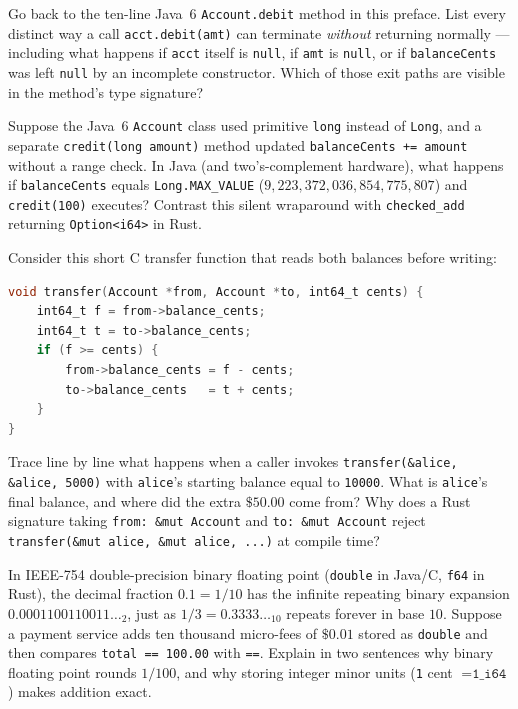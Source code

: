 \begin{exercise}
Go back to the ten-line Java~6 \texttt{Account.debit} method in this preface. List every distinct way a call \texttt{acct.debit(amt)} can terminate \emph{without} returning normally --- including what happens if \texttt{acct} itself is \texttt{null}, if \texttt{amt} is \texttt{null}, or if \texttt{balanceCents} was left \texttt{null} by an incomplete constructor. Which of those exit paths are visible in the method's type signature?
\end{exercise}

\begin{exercise}
Suppose the Java~6 \texttt{Account} class used primitive \texttt{long} instead of \texttt{Long}, and a separate \texttt{credit(long amount)} method updated \texttt{balanceCents += amount} without a range check. In Java (and two's-complement hardware), what happens if \texttt{balanceCents} equals \texttt{Long.MAX\_VALUE} ($9{,}223{,}372{,}036{,}854{,}775{,}807$) and \texttt{credit(100)} executes? Contrast this silent wraparound with \texttt{checked\_add} returning \texttt{Option<i64>} in Rust.
\end{exercise}

\begin{exercise}
Consider this short C transfer function that reads both balances before writing:
\begin{lstlisting}[language=C]
void transfer(Account *from, Account *to, int64_t cents) {
    int64_t f = from->balance_cents;
    int64_t t = to->balance_cents;
    if (f >= cents) {
        from->balance_cents = f - cents;
        to->balance_cents   = t + cents;
    }
}
\end{lstlisting}
Trace line by line what happens when a caller invokes \texttt{transfer(\&alice, \&alice, 5000)} with \texttt{alice}'s starting balance equal to \texttt{10000}. What is \texttt{alice}'s final balance, and where did the extra $\$50.00$ come from? Why does a Rust signature taking \texttt{from: \&mut Account} and \texttt{to: \&mut Account} reject \texttt{transfer(\&mut alice, \&mut alice, ...)} at compile time?
\end{exercise}

\begin{exercise}
In IEEE-754 double-precision binary floating point (\texttt{double} in Java/C, \texttt{f64} in Rust), the decimal fraction $0.1 = 1/10$ has the infinite repeating binary expansion $0.0001100110011\dots_2$, just as $1/3 = 0.3333\dots_{10}$ repeats forever in base $10$. Suppose a payment service adds ten thousand micro-fees of $\$0.01$ stored as \texttt{double} and then compares \texttt{total == 100.00} with \texttt{==}. Explain in two sentences why binary floating point rounds $1/100$, and why storing integer minor units (\texttt{1} cent $= \texttt{1\_i64}$) makes addition exact.
\end{exercise}

\chapterline

